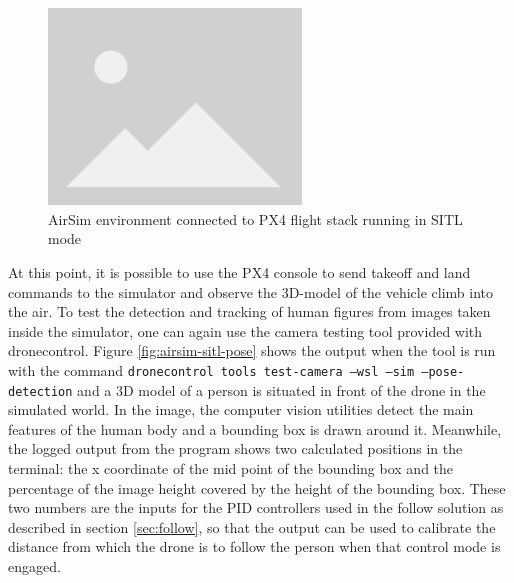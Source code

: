 \begin{figure}
  \centering
  \includegraphics[width=0.6\textwidth, keepaspectratio]{img/placeholder.png}
  \caption{AirSim environment connected to PX4 flight stack running in SITL mode}
  \label{fig:airsim-sitl}
\end{figure}

At this point, it is possible to use the PX4 console to send takeoff and land commands to the simulator and observe the 3D-model of the vehicle climb into the air.
To test the detection and tracking of human figures from images taken inside the simulator, one can again use the camera testing tool provided with dronecontrol.
Figure \ref{fig:airsim-sitl-pose} shows the output when the tool is run with the command \texttt{dronecontrol tools test-camera --wsl --sim --pose-detection} and a 3D model of a person is situated in front of the drone in the simulated world.
In the image, the computer vision utilities detect the main features of the human body and a bounding box is drawn around it.
Meanwhile, the logged output from the program shows two calculated positions in the terminal: the x coordinate of the mid point of the bounding box and the percentage of the image height covered by the height of the bounding box.
These two numbers are the inputs for the PID controllers used in the follow solution as described in section \ref{sec:follow}, so that the output can be used to calibrate the distance from which the drone is to follow the person when that control mode is engaged.

